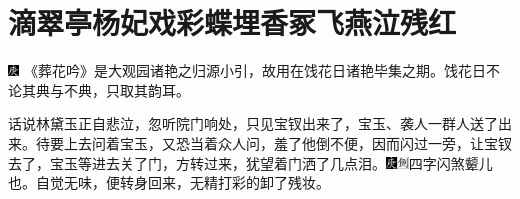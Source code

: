 

\chapter{滴翠亭杨妃戏彩蝶\hspace{.5em}埋香冢飞燕泣残红}

{\includegraphics[width=3mm]{../Images/00004} \kaishu 《葬花吟》是大观园诸艳之归源小引，故用在饯花日诸艳毕集之期。饯花日不论其典与不典，只取其韵耳。}

话说林黛玉正自悲泣，忽听院门响处，只见宝钗出来了，宝玉、袭人一群人送了出来。待要上去问着宝玉，又恐当着众人问，羞了他倒不便，因而闪过一旁，让宝钗去了，宝玉等进去关了门，方转过来，犹望着门洒了几点泪。{\includegraphics[width=3mm]{../Images/00004}\includegraphics[width=3mm]{../Images/00011}\footnotesize \kaishu 四字闪煞颦儿也。}自觉无味，便转身回来，无精打彩的卸了残妆。


